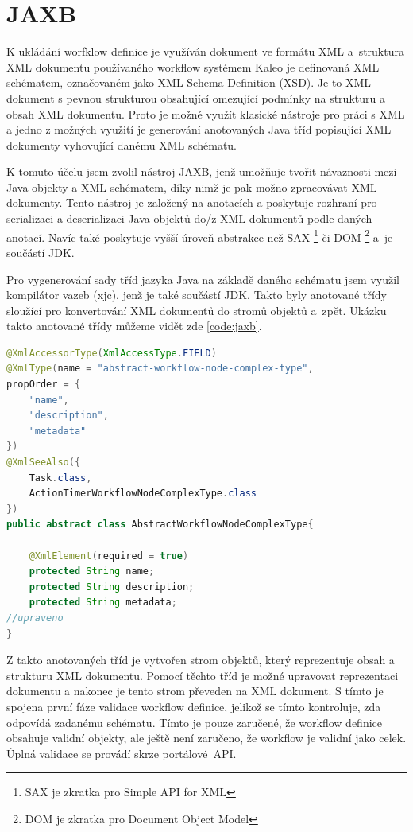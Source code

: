 \documentclass{fithesis}
\begin{document}
\section{JAXB}
K ukládání worfklow definice je využíván dokument ve formátu XML a~struktura XML dokumentu používaného workflow systémem Kaleo je definovaná XML schématem, označovaném jako XML Schema Definition (XSD). Je to XML dokument s pevnou strukturou obsahující omezující podmínky na strukturu a obsah XML dokumentu. Proto je možné využít klasické nástroje pro práci s XML a jedno z možných využití je generování anotovaných Java tříd popisující XML dokumenty vyhovující danému XML schématu. 

K tomuto účelu jsem zvolil nástroj JAXB, jenž umožňuje tvořit návaznosti mezi Java objekty a XML schématem, díky nimž je pak možno zpracovávat XML dokumenty. Tento nástroj je založený na anotacích a poskytuje rozhraní pro serializaci a deserializaci Java objektů do/z XML dokumentů podle daných anotací. Navíc také poskytuje vyšší úroveň abstrakce než SAX \footnote{SAX je zkratka pro Simple API for XML} či DOM \footnote{DOM je zkratka pro Document Object Model} a~je součástí JDK.

Pro vygenerování sady tříd jazyka Java na základě daného schématu jsem využil kompilátor vazeb (xjc), jenž je také součástí JDK. Takto byly anotované třídy sloužící pro konvertování XML dokumentů do stromů objektů a~zpět. Ukázku takto anotované třídy můžeme vidět zde \ref{code:jaxb}.

\begin{lstlisting}[language=Java, float =h , caption = Java třída s JAXB anotacemi , label = code:jaxb ]
@XmlAccessorType(XmlAccessType.FIELD)
@XmlType(name = "abstract-workflow-node-complex-type", 
propOrder = {
    "name",
    "description",
    "metadata"
})
@XmlSeeAlso({
    Task.class,
    ActionTimerWorkflowNodeComplexType.class
})
public abstract class AbstractWorkflowNodeComplexType{

    @XmlElement(required = true)
    protected String name;
    protected String description;
    protected String metadata;
//upraveno
}

\end{lstlisting}

Z takto anotovaných tříd je vytvořen strom objektů, který reprezentuje obsah a strukturu XML dokumentu. Pomocí těchto tříd je možné upravovat reprezentaci dokumentu a nakonec je tento strom převeden na XML dokument. S tímto je spojena první fáze validace workflow definice, jelikož se tímto kontroluje, zda odpovídá zadanému schématu. Tímto je pouze zaručené, že workflow definice obsahuje validní objekty, ale ještě není zaručeno, že workflow je validní jako celek. Úplná validace se provádí skrze portálové~API.
\end{document}
